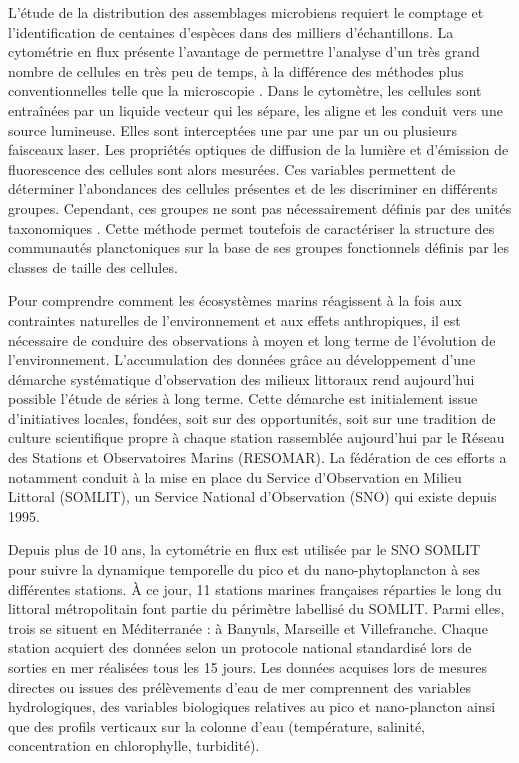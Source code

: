 \documentclass[12pt]{article}
\begin{document}
L’étude de la distribution des assemblages microbiens requiert le comptage et l’identification de centaines d’espèces dans des milliers d’échantillons. La cytométrie en flux présente l’avantage de permettre l’analyse d’un très grand nombre de cellules en très peu de temps, à la différence des méthodes plus conventionnelles telle que la microscopie \citep{Trask1982}. Dans le cytomètre, les cellules sont entraînées par un liquide vecteur qui les sépare, les aligne et les conduit vers une source lumineuse. Elles sont interceptées une par une par  un ou plusieurs faisceaux laser. Les propriétés optiques de diffusion de la lumière et d’émission de fluorescence des cellules sont alors mesurées. Ces variables permettent de déterminer l’abondances des cellules présentes et de les discriminer en différents groupes. Cependant, ces groupes ne sont pas nécessairement définis par des unités taxonomiques \citep{Trask1982}. Cette méthode permet toutefois de caractériser la structure des communautés planctoniques sur la base de ses groupes fonctionnels \citep{LeQuere2005} définis par les classes de taille des cellules.

Pour comprendre comment les écosystèmes marins réagissent à la fois aux contraintes naturelles de l’environnement et aux effets anthropiques, il est nécessaire de conduire des observations à moyen et long terme de l’évolution de l’environnement. L’accumulation des données grâce au développement d’une démarche systématique d’observation des milieux littoraux rend aujourd’hui possible l’étude de séries à long terme. Cette démarche est initialement issue d’initiatives locales, fondées, soit sur des opportunités, soit sur une tradition de culture scientifique propre à chaque station rassemblée aujourd’hui par le Réseau des Stations et Observatoires Marins (RESOMAR). La fédération de ces efforts a notamment conduit à la mise en place du Service d’Observation en Milieu Littoral (SOMLIT), un Service National d’Observation (SNO) qui existe depuis 1995.

Depuis plus de 10 ans, la cytométrie en flux est utilisée par le SNO SOMLIT pour suivre la dynamique temporelle du pico et du nano-phytoplancton à ses différentes stations. À ce jour, 11 stations marines françaises réparties le long du littoral métropolitain font partie du périmètre labellisé du SOMLIT. Parmi elles, trois se situent en Méditerranée : à Banyuls, Marseille et Villefranche. Chaque station acquiert des données selon un protocole national standardisé lors de sorties en mer réalisées tous les 15 jours. Les données acquises lors de mesures directes ou issues des prélèvements d’eau de mer comprennent des va\-riables hydrologiques, des variables biologiques relatives au pico et nano-plancton ainsi que des profils verticaux sur la colonne d'eau (température, salinité, concentration en chlorophylle, turbidité).
\end{document}
